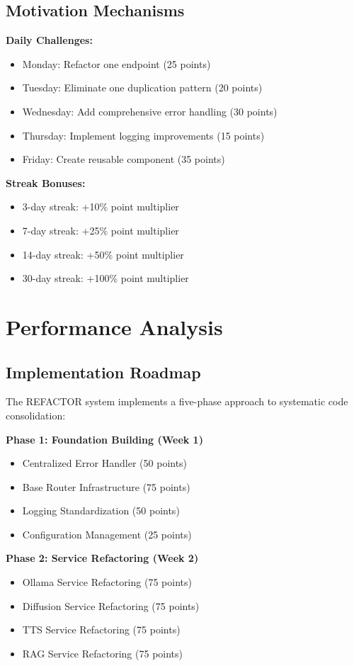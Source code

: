\documentclass[10pt]{article}
\begin{document}
\subsection{Motivation Mechanisms}

\textbf{Daily Challenges:}
\begin{itemize}
    \item Monday: Refactor one endpoint (25 points)
    \item Tuesday: Eliminate one duplication pattern (20 points)
    \item Wednesday: Add comprehensive error handling (30 points)
    \item Thursday: Implement logging improvements (15 points)
    \item Friday: Create reusable component (35 points)
\end{itemize}

\textbf{Streak Bonuses:}
\begin{itemize}
    \item 3-day streak: +10\% point multiplier
    \item 7-day streak: +25\% point multiplier
    \item 14-day streak: +50\% point multiplier
    \item 30-day streak: +100\% point multiplier
\end{itemize}

\section{Performance Analysis}

\subsection{Implementation Roadmap}

The REFACTOR system implements a five-phase approach to systematic code consolidation:

\textbf{Phase 1: Foundation Building (Week 1)}
\begin{itemize}
    \item Centralized Error Handler (50 points)
    \item Base Router Infrastructure (75 points)
    \item Logging Standardization (50 points)
    \item Configuration Management (25 points)
\end{itemize}

\textbf{Phase 2: Service Refactoring (Week 2)}
\begin{itemize}
    \item Ollama Service Refactoring (75 points)
    \item Diffusion Service Refactoring (75 points)
    \item TTS Service Refactoring (75 points)
    \item RAG Service Refactoring (75 points)
\end{itemize}
\end{document}
